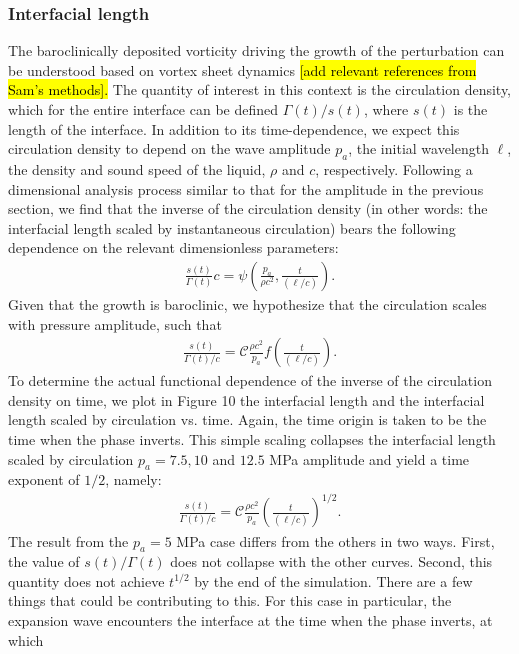 \documentclass{jfm}%
\begin{document}
\subsubsection{Interfacial length}
The baroclinically deposited vorticity driving the growth of the
perturbation can be understood based on vortex sheet dynamics \hl{[add
relevant references from Sam's methods].} The quantity of interest in
this context is the circulation density, which for the entire
interface can be defined $\Gamma(t) / s(t)$, where $s(t)$ is
the length of the interface. In addition to its time-dependence, we
expect this circulation density to depend on the wave amplitude $p_a$,
the initial wavelength $\ell$, the density and sound speed of
the liquid, $\rho$ and $c$, respectively. Following a dimensional
analysis process similar to that for the amplitude in the previous
section, we find that the inverse of the circulation density (in
other words: the interfacial length scaled by instantaneous
circulation) bears the following dependence on the relevant
dimensionless parameters:%
%
\begin{align}
  \frac{s(t)}{\Gamma(t)}c = \psi\left(\frac{p_a}{\rho c^2},\frac{t}{(\ell/c)}\right).%
\end{align}
%
Given that the growth is baroclinic, we hypothesize that the
circulation scales with pressure amplitude, such that%
%
\begin{align}
  \frac{s(t)}{\Gamma(t)/c} = \mathcal{C} \frac{\rho c^2}{p_a}f\left(\frac{t}{(\ell/c)}\right).%
\end{align}%
%
To determine the actual functional dependence of the inverse of the
circulation density on time, we plot in Figure 10 the interfacial
length and the interfacial length scaled by circulation
vs. time. Again, the time origin is taken to be the time when the
phase inverts. This simple scaling collapses the interfacial length
scaled by circulation $p_a = 7.5, 10$ and $12.5$ MPa amplitude and yield a
time exponent of $1/2$, namely:%
%
\begin{align}%
  \frac{s(t)}{\Gamma(t)/c} = \mathcal{C} \frac{\rho c^2}{p_a}\left(\frac{t}{(\ell/c)}\right)^{1/2}.%
\end{align}%
%
The result from the $p_a = 5$ MPa case differs from the others in two
ways. First, the value of $s(t)/\Gamma(t)$ does not collapse with the
other curves. Second, this quantity does not achieve $t^{1/2}$ by the
end of the simulation. There are a few things that could be
contributing to this. For this case in particular, the expansion wave
encounters the interface at the time when the phase inverts, at which
\end{document}
